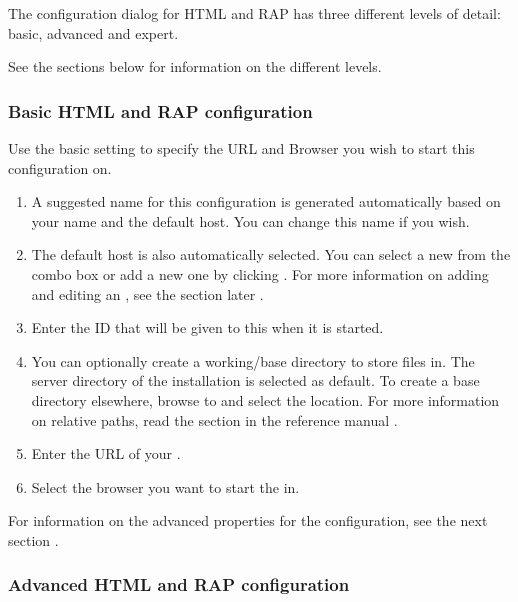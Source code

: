

The \gdaut{} configuration dialog for HTML and RAP has three different levels of detail: basic, advanced and expert. 

See the sections below for information on the different levels. 

\subsubsection{Basic HTML and RAP \gdaut{} configuration}

Use the basic setting to specify the URL and Browser you wish to start this \gdaut{} configuration on. 

\begin{enumerate}
\item A suggested name for this \gdaut{} configuration is generated automatically based on your \gdaut{} name and the default \gdagent{} host. You can change this name if you wish. 
\item The default \gdagent host is also automatically selected. You can select a new \gdagent{} from the combo box or add a new one by clicking . For more information on adding and editing an \gdagent{}, see the section later .
\item Enter the \gdaut{} ID that will be given to this \gdaut{} when it is started.  
\item You can optionally create a working/base directory to store files in. The server directory of the \app{} installation is selected as default. To create a base directory elsewhere, browse to and select the location.  For more information on relative paths, read the section in the reference manual . 
\item Enter the URL of your \gdaut{}.
\item Select the browser you want to start the \gdaut{} in.
\end{enumerate}
For information on the advanced properties for the \gdaut{} configuration, see the next section . 

\subsubsection{Advanced HTML and RAP \gdaut{} configuration}
\label{AdvancedAUTConfigHTML}

